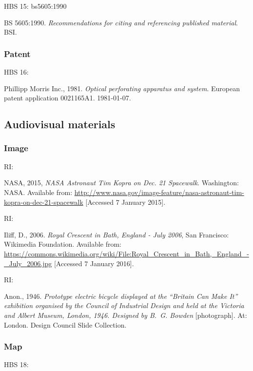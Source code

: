 HBS 15: bs5605:1990

BS 5605:1990. \emph{Recommendations for citing and referencing published material}. BSI.



\subsubsection*{Patent}

HBS 16: \cite{pm1981opa}

Phillipp Morris Inc., 1981. \emph{Optical perforating apparatus and system}. European patent application 0021165A1. 1981-01-07.



\subsection{Audiovisual materials}

\subsubsection*{Image}

RI: \cite{nasa2015nat}

NASA, 2015, \emph{NASA Astronaut Tim Kopra on Dec. 21 Spacewalk}. Washington: NASA. Available from: \url{http://www.nasa.gov/image-feature/nasa-astronaut-tim-kopra-on-dec-21-spacewalk} [Accessed 7 January 2015].


RI: \cite{iliff2006rcb}

 Iliff, D., 2006. \emph{Royal Crescent in Bath, England - July 2006}, San Francisco: Wikimedia Foundation. Available from: \url{https://commons.wikimedia.org/wiki/File:Royal_Crescent_in_Bath,_England_-_July_2006.jpg} [Accessed 7 January 2016].


RI: \cite{anon1946peb}

Anon., 1946. \emph{Prototype electric bicycle displayed at the \enquote{Britain Can Make It} exhibition organised by the Council of Industrial Design and held at the Victoria and Albert Museum, London, 1946. Designed by B.~G. Bowden} [photograph]. At: London. Design Council Slide Collection.



\subsubsection*{Map}

HBS 18: \cite{andrews.dury1773wilts}

